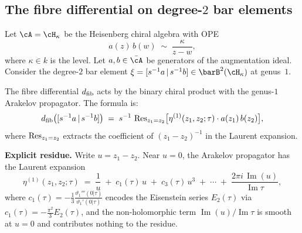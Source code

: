 \subsection{The fibre differential on degree-$2$ bar elements}
\label{subsec:dfib-degree-2}

\begin{computation}
\label{comp:dfib-heisenberg-genus1}

Let $\cA = \cH_\kappa$ be the Heisenberg chiral algebra with OPE
\begin{equation}\label{eq:heisenberg-OPE-kappa}
 a(z)\, b(w)
 \;\sim\;
 \frac{\kappa}{z-w},
\end{equation}
where $\kappa \in k$ is the level. Let $a, b \in \bar\cA$
be generators of the augmentation ideal. Consider the degree-$2$
bar element $\xi = [s^{-1}a \,|\, s^{-1}b] \in \barB^2(\cH_\kappa)$
at genus~$1$.

The fibre differential $d_{\mathrm{fib}}$ acts by the binary chiral product
with the genus-$1$ Arakelov propagator. The formula is:
\begin{equation}\label{eq:dfib-bar-2}
 d_{\mathrm{fib}}\bigl([s^{-1}a \,|\, s^{-1}b]\bigr)
 \;=\;
 s^{-1}\,\operatorname{Res}_{z_1 = z_2}\bigl[
 \eta^{(1)}(z_1, z_2;\tau) \cdot
 a(z_1)\, b(z_2)
 \bigr],
\end{equation}
where $\operatorname{Res}_{z_1 = z_2}$ extracts the coefficient of
$(z_1 - z_2)^{-1}$ in the Laurent expansion.

\smallskip\noindent
\textbf{Explicit residue.}
Write $u = z_1 - z_2$. Near $u = 0$, the Arakelov propagator
has the Laurent expansion
\begin{equation}\label{eq:arakelov-laurent}
 \eta^{(1)}(z_1,z_2;\tau)
 \;=\;
 \frac{1}{u}
 \;+\;
 c_1(\tau)\, u
 \;+\;
 c_3(\tau)\, u^3
 \;+\;
 \cdots
 \;+\;
 \frac{2\pi i\,\operatorname{Im}(u)}{\operatorname{Im}\tau},
\end{equation}
where $c_1(\tau) = -\frac{1}{3}\frac{\vartheta_1'''(0|\tau)}
{\vartheta_1'(0|\tau)}$ encodes the Eisenstein series $E_2(\tau)$
via $c_1(\tau) = -\frac{\pi^2}{3}E_2(\tau)$, and the
non-holomorphic term $\operatorname{Im}(u)/\operatorname{Im}\tau$
is smooth at $u = 0$ and contributes nothing to the residue.


\end{computation}
